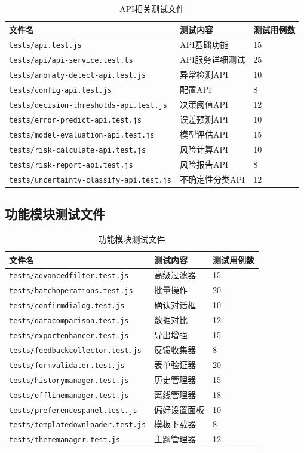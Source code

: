 \documentclass[12pt,a4paper,openany]{report}
\begin{document}
\begin{table}[h]
\centering
\caption{API相关测试文件}
\begin{tabular}{|l|l|l|}
\hline
\textbf{文件名} & \textbf{测试内容} & \textbf{测试用例数} \\
\hline
\texttt{tests/api.test.js} & API基础功能 & 15 \\
\texttt{tests/api/api-service.test.ts} & API服务详细测试 & 25 \\
\texttt{tests/anomaly-detect-api.test.js} & 异常检测API & 10 \\
\texttt{tests/config-api.test.js} & 配置API & 8 \\
\texttt{tests/decision-thresholds-api.test.js} & 决策阈值API & 12 \\
\texttt{tests/error-predict-api.test.js} & 误差预测API & 10 \\
\texttt{tests/model-evaluation-api.test.js} & 模型评估API & 15 \\
\texttt{tests/risk-calculate-api.test.js} & 风险计算API & 10 \\
\texttt{tests/risk-report-api.test.js} & 风险报告API & 8 \\
\texttt{tests/uncertainty-classify-api.test.js} & 不确定性分类API & 12 \\
\hline
\end{tabular}
\end{table}

\subsection{功能模块测试文件}

\begin{table}[h]
\centering
\caption{功能模块测试文件}
\begin{tabular}{|l|l|l|}
\hline
\textbf{文件名} & \textbf{测试内容} & \textbf{测试用例数} \\
\hline
\texttt{tests/advancedfilter.test.js} & 高级过滤器 & 15 \\
\texttt{tests/batchoperations.test.js} & 批量操作 & 20 \\
\texttt{tests/confirmdialog.test.js} & 确认对话框 & 10 \\
\texttt{tests/datacomparison.test.js} & 数据对比 & 12 \\
\texttt{tests/exportenhancer.test.js} & 导出增强 & 15 \\
\texttt{tests/feedbackcollector.test.js} & 反馈收集器 & 8 \\
\texttt{tests/formvalidator.test.js} & 表单验证器 & 20 \\
\texttt{tests/historymanager.test.js} & 历史管理器 & 15 \\
\texttt{tests/offlinemanager.test.js} & 离线管理器 & 18 \\
\texttt{tests/preferencespanel.test.js} & 偏好设置面板 & 10 \\
\texttt{tests/templatedownloader.test.js} & 模板下载器 & 8 \\
\texttt{tests/thememanager.test.js} & 主题管理器 & 12 \\
\hline
\end{tabular}
\end{table}
\end{document}
